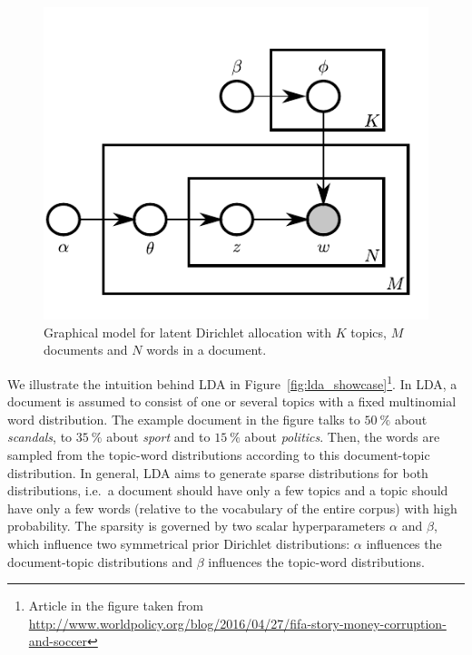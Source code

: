 \documentclass[
        a4paper,
        titlepage,
        twoside,
        parskip,
        numbers=noenddot
        ]{scrbook}
\theoremstyle{break}
\begin{document}
\begin{figure}
       \centering
       \includegraphics{figures/lda.pdf}
       \caption{Graphical model for latent Dirichlet allocation with $K$ topics, $M$ documents and $N$ words in a document.}
       \label{fig:lda}
\end{figure}

We illustrate the intuition behind LDA in Figure~\ref{fig:lda_showcase}\footnote{Article in the figure taken from \\ \url{http://www.worldpolicy.org/blog/2016/04/27/fifa-story-money-corruption-and-soccer}}.
In LDA, a document is assumed to consist of one or several topics with a fixed multinomial word distribution.
The example document in the figure talks to $50~\%$ about \emph{scandals}, to $35~\%$ about \emph{sport} and to $15~\%$ about \emph{politics}.
Then, the words are sampled from the topic-word distributions according to this document-topic distribution.
In general, LDA aims to generate sparse distributions for both distributions, i.e.\ a document should have only a few topics and a topic should have only a few words (relative to the vocabulary of the entire corpus) with high probability.
The sparsity is governed by two scalar hyperparameters $\alpha$ and $\beta$, which influence two symmetrical prior Dirichlet distributions:
$\alpha$ influences the document-topic distributions and $\beta$ influences the topic-word distributions.
\end{document}
